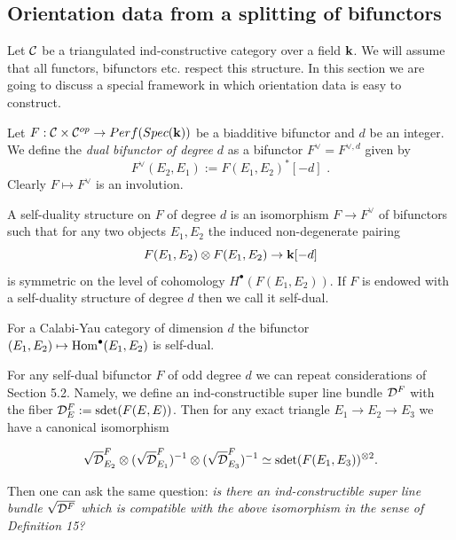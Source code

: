 \documentclass[12pt]{article}
\begin{document}
\subsection{Orientation data from a splitting of bifunctors}

Let $\cal C$ be a triangulated ind-constructive category over a field ${\bf k}$.  We will assume that all functors, bifunctors
etc. respect this structure. In this section we are going to discuss a special framework in which orientation data is easy to construct.

Let $F:{\mathcal C}\times {\mathcal C}^{op}\to Perf(Spec({\bf k}))$ be a biadditive bifunctor and $d$ be an integer. We define the {\it dual bifunctor of degree $d$} as a bifunctor $F^{\vee}=F^{\vee,d}$ given by
$$F^{\vee}(E_2,E_1):=F(E_1,E_2)^{\ast}[-d]\,\,.$$
Clearly $F\mapsto F^{\vee}$ is an involution.
\begin{defn} A self-duality structure on $F$ of degree $d$ is an isomorphism $F\to F^{\vee}$ of bifunctors such that for any two objects $E_1,E_2$ the induced non-degenerate pairing
$$F(E_1,E_2)\otimes F(E_1,E_2)\to {\bf k}[-d]$$ is symmetric on the level of cohomology 
$H^\bullet(F(E_1,E_2))$. If $F$ is endowed with a self-duality structure of degree $d$ then we call it self-dual.

\end{defn}


For a Calabi-Yau category of dimension $d$  the bifunctor $(E_1,E_2)\mapsto \operatorname{Hom}^{\bullet}(E_1,E_2)$ is self-dual.

For any self-dual bifunctor $F$ of odd degree $d$ we can repeat considerations of Section 5.2. Namely, we define an ind-constructible super line bundle ${\cal D}^F$ with the fiber  ${\cal D}^F_E:=\operatorname{sdet}(F(E,E))$. Then for any exact triangle $E_1\to E_2\to E_3$ we have a canonical isomorphism


$$\sqrt{{\cal D}}_{E_2}^F\otimes (\sqrt{{\cal D}}_{E_1}^F)^{-1}\otimes (\sqrt{{\cal D}}_{E_3}^F)^{-1}\simeq \operatorname{sdet}(F(E_1,E_3))^{\otimes 2}.$$

Then one can ask the same question: {\it is there an ind-constructible super line bundle $\sqrt{{\cal D}^F}$ which is compatible with the above isomorphism in the sense of Definition 15?}
\end{document}
